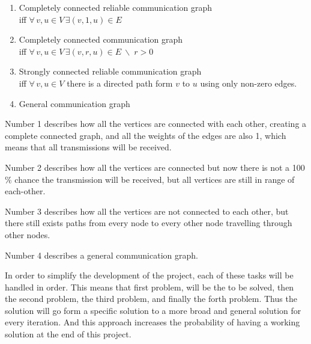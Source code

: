 \begin{enumerate}[label=\itshape \arabic*\upshape)]
    \item Completely connected reliable communication graph \\   
    iff $\forall\, v, u \in V \, \exists (v,1,u)\in E$
    \item Completely connected communication graph \\
    iff $\forall\, v, u \in V \, \exists (v,r,u)\in E\ \backslash \; r>0$
    \item Strongly connected reliable communication graph \\  
    iff $\forall\, v, u \in V $ there is a directed path form $v$ to $u$ using only non-zero edges.    
    \item General communication graph
\end{enumerate}

Number 1 describes how all the vertices are connected with each other, creating a complete connected graph, and all the weights of the edges are also 1, which means that all transmissions will be received.

Number 2 describes how all the vertices are connected but now there is not a 100 \% chance the transmission will be received, but all vertices are still in range of each-other.

Number 3 describes how all the vertices are not connected to each other, but there still exists paths from every node to every other node travelling through other nodes.

Number 4 describes a general communication graph.

\bigskip \noindent
In order to simplify the development of the project, each of these tasks will be handled in order.
This means that first problem, will be the to be solved, then the second problem, the third problem, and finally the forth problem.
Thus the solution will go form a specific solution to a more broad and general solution for every iteration.
And this approach increases the probability of having a working solution at the end of this project.

